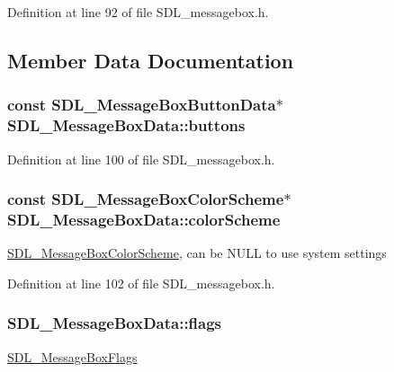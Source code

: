 Definition at line 92 of file S\-D\-L\-\_\-messagebox.\-h.



\subsection{Member Data Documentation}
\hypertarget{struct_s_d_l___message_box_data_a265e47aab749e384661ae91d3e11e0db}{
\subsubsection[{buttons}]{\setlength{\rightskip}{0pt plus 5cm}const {\bf S\-D\-L\-\_\-\-Message\-Box\-Button\-Data}$\ast$ S\-D\-L\-\_\-\-Message\-Box\-Data\-::buttons}}\label{struct_s_d_l___message_box_data_a265e47aab749e384661ae91d3e11e0db}


Definition at line 100 of file S\-D\-L\-\_\-messagebox.\-h.

\hypertarget{struct_s_d_l___message_box_data_a18744865a3e89e260db5f01aee579e35}{
\subsubsection[{color\-Scheme}]{\setlength{\rightskip}{0pt plus 5cm}const {\bf S\-D\-L\-\_\-\-Message\-Box\-Color\-Scheme}$\ast$ S\-D\-L\-\_\-\-Message\-Box\-Data\-::color\-Scheme}}\label{struct_s_d_l___message_box_data_a18744865a3e89e260db5f01aee579e35}
\hyperlink{struct_s_d_l___message_box_color_scheme}{S\-D\-L\-\_\-\-Message\-Box\-Color\-Scheme}, can be N\-U\-L\-L to use system settings 

Definition at line 102 of file S\-D\-L\-\_\-messagebox.\-h.

\hypertarget{struct_s_d_l___message_box_data_a113d016f760bf4e4156b0f376358d6a0}{
\subsubsection[{flags}]{ S\-D\-L\-\_\-\-Message\-Box\-Data\-::flags}}\label{struct_s_d_l___message_box_data_a113d016f760bf4e4156b0f376358d6a0}
\hyperlink{_s_d_l__messagebox_8h_a97f06819ac610581044fdb93d81eed37}{S\-D\-L\-\_\-\-Message\-Box\-Flags} 

